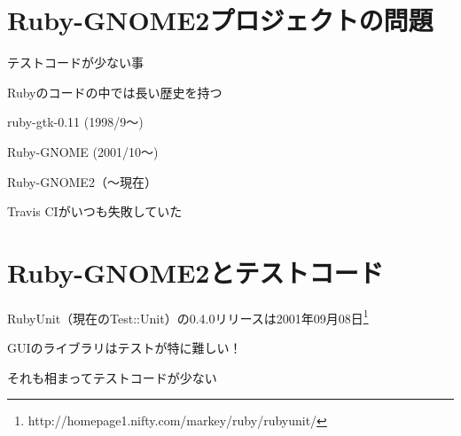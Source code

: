 \section{Ruby-GNOME2プロジェクトの問題}

\begin{frame}
\begin{itemize}
{\Large
\item{} テストコードが少ない事
\item{} Rubyのコードの中では長い歴史を持つ

ruby-gtk-0.11 (1998/9〜)

Ruby-GNOME (2001/10〜)

Ruby-GNOME2（〜現在）
}
{\huge
\item{} Travis CIがいつも失敗していた
}
\end{itemize}
\end{frame}

\section{Ruby-GNOME2とテストコード}

\begin{frame}
\begin{itemize}
{\huge
\item RubyUnit（現在のTest::Unit）の0.4.0リリースは2001年09月08日\footnote{http://homepage1.nifty.com/markey/ruby/rubyunit/}
\item GUIのライブラリはテストが特に難しい！
\item それも相まってテストコードが少ない
}
\end{itemize}
\end{frame}
